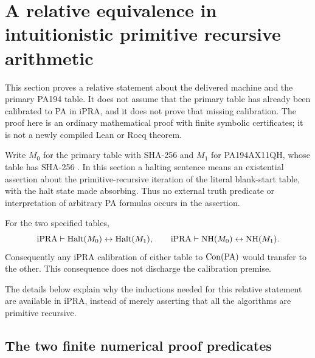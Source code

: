 \section{A relative equivalence in intuitionistic primitive recursive arithmetic}
\label{sec:relative-ipra}

This section proves a relative statement about the delivered machine and
the primary PA194 table.  It does not assume that the primary table has
already been calibrated to PA in iPRA, and it does not prove that missing
calibration.  The proof here is an ordinary mathematical proof with finite
symbolic certificates; it is not a newly compiled Lean or Rocq theorem.

Write $M_0$ for the primary table with SHA-256
and $M_1$ for PA194AX11QH, whose table has SHA-256
.
In this section a halting sentence means an existential assertion about
the primitive-recursive iteration of the literal blank-start table,
with the halt state made absorbing.  Thus no external truth predicate
or interpretation of arbitrary PA formulas occurs in the assertion.

\begin{theorem}
\label{thm:relative-ipra}
For the two specified tables,
\[
 \mathrm{iPRA}\vdash \operatorname{Halt}(M_0)\leftrightarrow\operatorname{Halt}(M_1),
 \qquad
 \mathrm{iPRA}\vdash \operatorname{NH}(M_0)\leftrightarrow\operatorname{NH}(M_1).
\]
Consequently any iPRA calibration of either table to $\operatorname{Con}(\mathrm{PA})$
would transfer to the other.  This consequence does not discharge the
calibration premise.
\end{theorem}

The details below explain why the inductions needed for this relative
statement are available in iPRA, instead of merely asserting that all
the algorithms are primitive recursive.

\subsection{The two finite numerical proof predicates}

